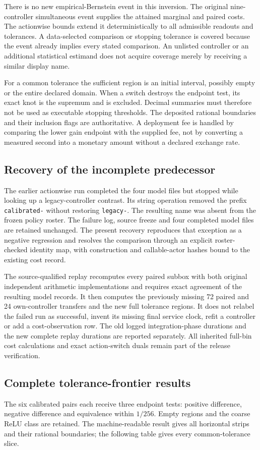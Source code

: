 There is no new empirical-Bernstein event in this inversion. The original nine-controller simultaneous event supplies the attained marginal and paired costs. The actionwise bounds extend it deterministically to all admissible readouts and tolerances. A data-selected comparison or stopping tolerance is covered because the event already implies every stated comparison. An unlisted controller or an additional statistical estimand does not acquire coverage merely by receiving a similar display name.

For a common tolerance the sufficient region is an initial interval, possibly empty or the entire declared domain. When a switch destroys the endpoint test, its exact knot is the supremum and is excluded. Decimal summaries must therefore not be used as executable stopping thresholds. The deposited rational boundaries and their inclusion flags are authoritative. A deployment fee is handled by comparing the lower gain endpoint with the supplied fee, not by converting a measured second into a monetary amount without a declared exchange rate.

\subsection{Recovery of the incomplete predecessor}
The earlier actionwise run completed the four model files but stopped while looking up a legacy-controller contrast. Its string operation removed the prefix \texttt{calibrated-} without restoring \texttt{legacy-}. The resulting name was absent from the frozen policy roster. The failure log, source freeze and four completed model files are retained unchanged. The present recovery reproduces that exception as a negative regression and resolves the comparison through an explicit roster-checked identity map, with construction and callable-actor hashes bound to the existing cost record.

The source-qualified replay recomputes every paired subbox with both original independent arithmetic implementations and requires exact agreement of the resulting model records. It then computes the previously missing 72 paired and 24 own-controller transfers and the new full tolerance regions. It does not relabel the failed run as successful, invent its missing final service clock, refit a controller or add a cost-observation row. The old logged integration-phase durations and the new complete replay durations are reported separately. All inherited full-bin cost calculations and exact action-switch duals remain part of the release verification.

\subsection{Complete tolerance-frontier results}
The six calibrated pairs each receive three endpoint tests: positive difference, negative difference and equivalence within $1/256$. Empty regions and the coarse ReLU class are retained. The machine-readable result gives all horizontal strips and their rational boundaries; the following table gives every common-tolerance slice.


